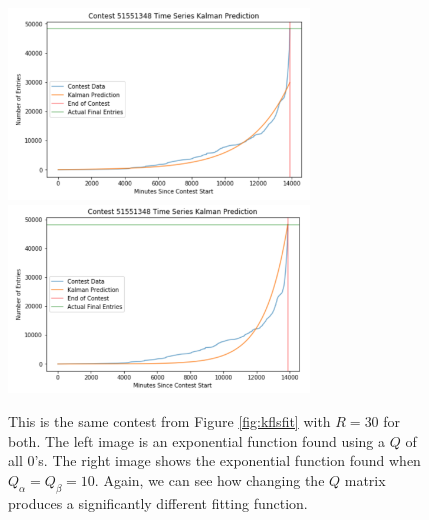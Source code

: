 \begin{figure}[h]
\centering
\includegraphics[width=8cm]{body/methodology/KF_True0.png}
\includegraphics[width=8cm]{body/methodology/KF_True10.png}
\caption[Additional Varied Parameter Kalman Filters]{This is the same contest from Figure \ref{fig:kflsfit} with $R = 30$ for both. The left image is an exponential function found using a $Q$ of all 0's. The right image shows the exponential function found when $Q_{\alpha} = Q_{\beta} = 10$. Again, we can see how changing the $Q$ matrix produces a significantly different fitting function.}
\label{fig:ekfexamp}
\end{figure}